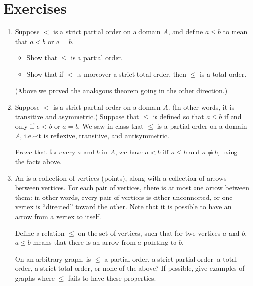 \documentclass[letterpaper,10pt,english]{sphinxmanual}
\begin{document}
\section{Exercises}
\label{\detokenize{relations:exercises}}\begin{enumerate}
%
\item {} 
\sphinxAtStartPar
Suppose \(<\) is a strict partial order on a domain \(A\), and define \(a \leq b\) to mean that \(a < b\) or \(a = b\).
\begin{itemize}
\item {} 
\sphinxAtStartPar
Show that \(\leq\) is a partial order.

\item {} 
\sphinxAtStartPar
Show that if \(<\) is moreover a strict total order, then \(\leq\) is a total order.

\end{itemize}

\sphinxAtStartPar
(Above we proved the analogous theorem going in the other direction.)

\item {} 
\sphinxAtStartPar
Suppose \(<\) is a strict partial order on a domain \(A\). (In other words, it is transitive and asymmetric.) Suppose that \(\leq\) is defined so that \(a \leq b\) if and only if \(a < b\) or \(a = b\). We saw in class that \(\leq\) is a partial order on a domain \(A\), i.e.\textasciitilde{}it is reflexive, transitive, and antisymmetric.

\sphinxAtStartPar
Prove that for every \(a\) and \(b\) in \(A\), we have \(a < b\) iff \(a \leq b\) and \(a \neq b\), using the facts above.

\item {} 
\sphinxAtStartPar
An  is a collection of vertices (points), along with a collection of arrows between vertices. For each pair of vertices, there is at most one arrow between them: in other words, every pair of vertices is either unconnected, or one vertex is “directed” toward the other. Note that it is possible to have an arrow from a vertex to itself.

\sphinxAtStartPar
Define a relation \(\leq\) on the set of vertices, such that for two vertices \(a\) and \(b\), \(a \leq b\) means that there is an arrow from \(a\) pointing to \(b\).

\sphinxAtStartPar
On an arbitrary graph, is \(\leq\) a partial order, a strict partial order, a total order, a strict total order, or none of the above? If possible, give examples of graphs where \(\leq\) fails to have these properties.


\end{enumerate}
\end{document}
